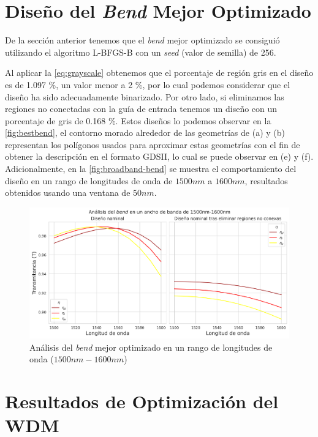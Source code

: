 \section{Diseño del \emph{Bend} Mejor Optimizado}\label{sec:best-bend}

De la sección anterior tenemos que el \emph{bend} mejor optimizado se consiguió
utilizando el algoritmo L-BFGS-B con un \emph{seed} (valor de semilla) de 256.

Al aplicar la \autoref{eq:grayscale} obtenemos que el porcentaje de región gris en el diseño
es de 1.097 \%, un valor menor a 2 \%, por lo cual podemos considerar que el diseño ha sido
adecuadamente binarizado. 
Por otro lado, si eliminamos las regiones no conectadas con la guía de entrada
tenemos un diseño con un porcentaje de gris de 0.168 \%.
Estos diseños lo podemos observar en la \autoref{fig:bestbend}, 
el contorno morado alrededor de las geometrías de (a) y (b) representan los polígonos
usados para aproximar estas geometrías con el fin de obtener la descripción en el formato
GDSII, lo cual se puede observar en (e) y (f).
Adicionalmente, en la \autoref{fig:broadband-bend} se muestra el comportamiento del diseño
en un rango de longitudes de onda de $1500nm$ a $1600 nm$, resultados obtenidos usando una ventana de $50nm$.

\begin{figure}[H]
  \centering
  \includegraphics[width=\textwidth]{image/results/bend/best/broadband-bend.png}
  \caption{Análisis del \emph{bend} mejor optimizado en un rango de longitudes de onda ($1500 nm-1600 nm$)}
  \label{fig:broadband-bend}
\end{figure}


\section{Resultados de Optimización del WDM}\label{sec:results-wdm}

